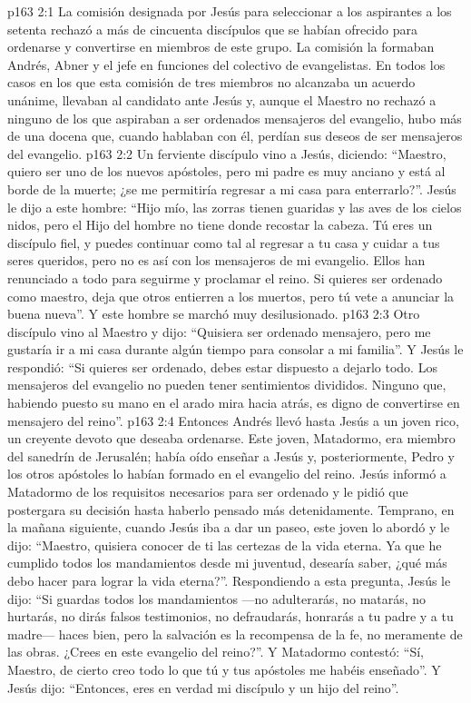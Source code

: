 \vs p163 2:1 La comisión designada por Jesús para seleccionar a los aspirantes a los setenta rechazó a más de cincuenta discípulos que se habían ofrecido para ordenarse y convertirse en miembros de este grupo. La comisión la formaban Andrés, Abner y el jefe en funciones del colectivo de evangelistas. En todos los casos en los que esta comisión de tres miembros no alcanzaba un acuerdo unánime, llevaban al candidato ante Jesús y, aunque el Maestro no rechazó a ninguno de los que aspiraban a ser ordenados mensajeros del evangelio, hubo más de una docena que, cuando hablaban con él, perdían sus deseos de ser mensajeros del evangelio.
\vs p163 2:2 \pc Un ferviente discípulo vino a Jesús, diciendo: “Maestro, quiero ser uno de los nuevos apóstoles, pero mi padre es muy anciano y está al borde de la muerte; ¿se me permitiría regresar a mi casa para enterrarlo?”. Jesús le dijo a este hombre: “Hijo mío, las zorras tienen guaridas y las aves de los cielos nidos, pero el Hijo del hombre no tiene donde recostar la cabeza. Tú eres un discípulo fiel, y puedes continuar como tal al regresar a tu casa y cuidar a tus seres queridos, pero no es así con los mensajeros de mi evangelio. Ellos han renunciado a todo para seguirme y proclamar el reino. Si quieres ser ordenado como maestro, deja que otros entierren a los muertos, pero tú vete a anunciar la buena nueva”. Y este hombre se marchó muy desilusionado.
\vs p163 2:3 Otro discípulo vino al Maestro y dijo: “Quisiera ser ordenado mensajero, pero me gustaría ir a mi casa durante algún tiempo para consolar a mi familia”. Y Jesús le respondió: “Si quieres ser ordenado, debes estar dispuesto a dejarlo todo. Los mensajeros del evangelio no pueden tener sentimientos divididos. Ninguno que, habiendo puesto su mano en el arado mira hacia atrás, es digno de convertirse en mensajero del reino”.
\vs p163 2:4 \pc Entonces Andrés llevó hasta Jesús a un joven rico, un creyente devoto que deseaba ordenarse. Este joven, Matadormo, era miembro del sanedrín de Jerusalén; había oído enseñar a Jesús y, posteriormente, Pedro y los otros apóstoles lo habían formado en el evangelio del reino. Jesús informó a Matadormo de los requisitos necesarios para ser ordenado y le pidió que postergara su decisión hasta haberlo pensado más detenidamente. Temprano, en la mañana siguiente, cuando Jesús iba a dar un paseo, este joven lo abordó y le dijo: “Maestro, quisiera conocer de ti las certezas de la vida eterna. Ya que he cumplido todos los mandamientos desde mi juventud, desearía saber, ¿qué más debo hacer para lograr la vida eterna?”. Respondiendo a esta pregunta, Jesús le dijo: “Si guardas todos los mandamientos ---no adulterarás, no matarás, no hurtarás, no dirás falsos testimonios, no defraudarás, honrarás a tu padre y a tu madre--- haces bien, pero la salvación es la recompensa de la fe, no meramente de las obras. ¿Crees en este evangelio del reino?”. Y Matadormo contestó: “Sí, Maestro, de cierto creo todo lo que tú y tus apóstoles me habéis enseñado”. Y Jesús dijo: “Entonces, eres en verdad mi discípulo y un hijo del reino”.
